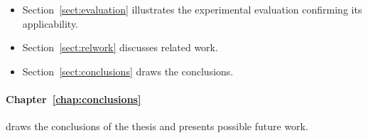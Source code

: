{\begin{itemize}
\item Section~\ref{sect:evaluation} illustrates the experimental evaluation confirming its applicability.

\item Section~\ref{sect:relwork} discusses related work.

\item Section~\ref{sect:conclusions} draws the conclusions.
\end{itemize}

\medskip

\paragraph*{Chapter~\ref{chap:conclusions}} draws the conclusions of the thesis and presents possible future work.

}

